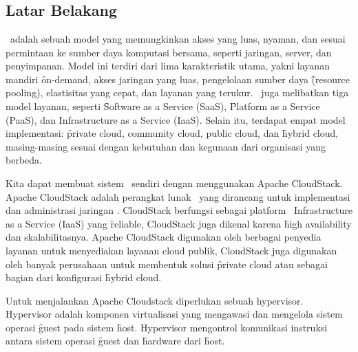 \chapter{\babSatu}


\section{Latar Belakang}
\cc\ adalah sebuah model yang memungkinkan akses yang luas, nyaman, dan sesuai permintaan ke sumber daya komputasi bersama, seperti jaringan, server, dan penyimpanan. Model ini terdiri dari lima karakteristik utama, yakni layanan mandiri \f{on-demand}, akses jaringan yang luas, pengelolaan sumber daya \f{(resource pooling)}, elastisitas yang cepat, dan layanan yang terukur. \cc\ juga melibatkan tiga model layanan, seperti \f{Software as a Service} (SaaS), \f{Platform as a Service} (PaaS), dan Infrastructure as a Service (IaaS). Selain itu, terdapat empat model implementasi: \f{private cloud, community cloud, public cloud,} dan \f{hybrid cloud,} masing-masing sesuai dengan kebutuhan dan kegunaan dari organisasi yang berbeda\cite{mell2009nist}.

Kita dapat membuat sistem \cc\ sendiri dengan menggunakan Apache CloudStack. Apache CloudStack adalah perangkat lunak \oss\ yang dirancang untuk implementasi dan administrasi jaringan \vm. CloudStack berfungsi sebagai platform \cc\ Infrastructure as a Service (IaaS) yang \f{reliable}, CloudStack juga dikenal karena \f{high availability} dan skalabilitasnya. Apache CloudStack digunakan oleh berbagai penyedia layanan untuk menyediakan layanan cloud publik, CloudStack juga digunakan oleh banyak perusahaan untuk membentuk solusi \f{private cloud} atau sebagai bagian dari konfigurasi \f{hybrid cloud}\cite{cloudstackabout}.

Untuk menjalankan Apache Cloudstack diperlukan sebuah hypervisor. Hypervisor adalah komponen virtualisasi yang mengawasi dan mengelola sistem operasi \f{guest} pada sistem \f{host}\cite{scarfone2009nist}. Hypervisor mengontrol komunikasi instruksi antara sistem operasi \f{guest} dan \f{hardware} dari \f{host}\cite{scarfone2009nist}.


